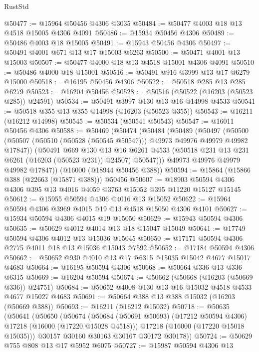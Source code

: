 \begin{lexlean}{RustStd}
\begin{coremodule}
@50477 := @15964 @50456 @4306 @3035
@50484 := @50477 @4003 @18 @13 @4518 @15005 @4306 @4091
@50486 := @15934 @50456 @4306
@50489 := @50486 @4003 @18 @15005
@50491 := @15943 @50456 @4306
@50497 := @50491 @4001 @671 @13 @17 @15003 @6263
@50500 := @50471 @4001 @13 @15003
@50507 := @50477 @4000 @18 @13 @4518 @15001 @4306 @4091
@50510 := @50486 @4000 @18 @15001
@50516 := @50491 @916 @3999 @13 @17 @6279 @15000
@50518 := @16195 @50456 @4306
@50522 := @50518 @285 @13 @285 @6279
@50523 := @16204 @50456
@50528 := @50516 (@50522 (@16203 (@50523 @285)) @24591)
@50534 := @50491 @3997 @130 @13 @16 @14998 @4533
@50541 := @50518 @355 @13 @355 @14998 (@16203 (@50523 @355))
@50543 := @16211 (@16212 @14998)
@50545 := @50534 (@50541 @50543)
@50547 := @16011 @50456 @4306
@50588 := @50469
    (@50474
      (@50484
        (@50489
          (@50497
            (@50500 (@50507 (@50510 (@50528 (@50545 @50547))) @49973 @49976 @49979 @49982 @17847))
            (@50491
              @669
              @130
              @13
              @16
              @6261
              @4533
              (@50518 @231 @13 @231 @6261 (@16203 (@50523 @231)) @24507)
              @50547)))
        @49973
        @49976
        @49979
        @49982
        @17847))
    (@16000 (@18944 @50456 @388))
@50594 := @15864 (@15866 @388 (@22663 (@15871 @388))) @50456
@50607 := @18903 @50594 @4306 @4306 @395 @13 @4016 @4059 @3763 @15052 @395 @11220 @15127 @15145
@50612 := @15955 @50594 @4306 @4016 @13 @15052
@50622 := @15964 @50594 @4306 @3969 @4015 @19 @13 @4518 @15050 @4306 @4101
@50627 := @15934 @50594 @4306 @4015 @19 @15050
@50629 := @15943 @50594 @4306
@50635 := @50629 @4012 @4014 @13 @18 @15047 @15049
@50641 := @17749 @50594 @4306 @4012 @13 @15036 @15045
@50650 := @17171 @50594 @4306 @2775 @4011 @18 @13 @15036 @15043 @7592
@50652 := @17184 @50594 @4306
@50662 := @50652 @930 @4010 @13 @17 @6315 @15035 @15042 @4677 @15017 @4683
@50664 := @16195 @50594 @4306
@50668 := @50664 @336 @13 @336 @6315
@50669 := @16204 @50594
@50674 := @50662 (@50668 (@16203 (@50669 @336)) @24751)
@50684 := @50652 @4008 @130 @13 @16 @15032 @4518 @4533 @4677 @15027 @4683
@50691 := @50664 @388 @13 @388 @15032 (@16203 (@50669 @388))
@50693 := @16211 (@16212 @15032)
@50718 := @50635
    (@50641
      (@50650
        (@50674
          (@50684 (@50691 @50693) (@17212 @50594 @4306) @17218 (@16000 (@17220 @15028 @4518)))
          @17218
          (@16000 (@17220 @15018 @15035)))
        @30157
        @30160
        @30163
        @30167
        @30172
        @30178))
@50724 := @50629 @755 @808 @13 @17 @5952 @6075
@50727 := @15987 @50594 @4306 @13

\end{coremodule}
\end{lexlean}
